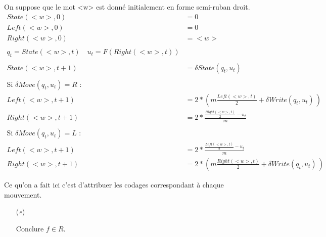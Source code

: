 \documentclass[12pt,letterpaper,boxed]{hmcpset}
\begin{document}
\begin{solution}[d)]
On suppose que le mot <w> est donné initialement en forme semi-ruban droit. \\

\begin{align*}
State(<w>,0) & = 0 \\
Left(<w>,0) & = 0 \\
Right(<w>,0) & = <w> \\ \\
q_{t} = State(<w>,t) \quad u_{t} = F(Right(<w>,t)) \\ \\
State(<w>,t+1) &= \delta State(q_{t}, u_{t}) \\ \\
\text{Si } \delta Move(q_{t}, u_{t}) = R \, \, :  \\ 
Left(<w>,t+1) &= 2*(m\frac{Left(<w>,t)}{2}+\delta Write(q_{t},u_{t})\, )  \\
Right(<w>,t+1) &= 2*\frac{\frac{Right(<w>,t)}{2}-u_{t}}{m} \\ \\
\text{Si } \delta Move(q_{t}, u_{t}) = L \, \, :  \\ 
Left(<w>,t+1) &=  2*\frac{\frac{Left(<w>,t)}{2}-u_{t}}{m} \\
Right(<w>,t+1) &= 2*(m\frac{Right(<w>,t)}{2}+\delta Write(q_{t},u_{t})\, )
\end{align*}

Ce qu'on a fait ici c'est d'attribuer les codages correspondant à chaque mouvement.

\end{solution}

\newpage

\begin{problem}
\begin{itemize}
  \item[(\textit{e})] 
  
 Conclure $f \in R$.    
   \end{itemize}
\end{problem}
\end{document}
